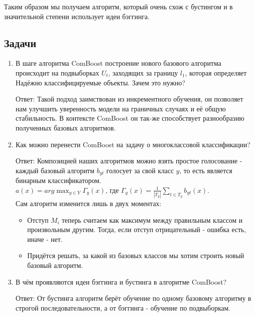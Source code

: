 Таким образом мы получаем алгоритм, который очень схож с бустингом и в значительной степени использует идеи бэггинга. \\

\subsection{Задачи}

\begin{enumerate}
    \item В шаге алгоритма ComBoost построение нового базового алгоритма происходит на подвыборках $U_t$, заходящих за границу $l_1$, которая определяет Надёжно классифицируемые объекты. Зачем это нужно?

          Ответ: Такой подход заимствован из инкрементного обучения, он позволяет нам улучшить уверенность модели на граничных случаях и её общую стабильность. В контексте ComBoost он так-же способствует разнообразию полученных базовых алгоритмов.

    \item Как можно перенести ComBoost на задачу о многоклассовой классификации?

          Ответ: Композицией наших алгоритмов можно взять простое голосование - каждый базовый алгоритм $b_{yt}$ голосует за свой класс $y$, то есть является бинарным классификатором. \\
          $a(x)=arg\max_{y\in Y}\Gamma_y(x)$, где $\Gamma_y(x) = \frac{1}{|T_y|}\sum_{t\in T_y}b_{yt}(x)$. \\
          Сам алгоритм изменится лишь в двух моментах: \\
          \begin{itemize}
              \item Отступ $M_i$ теперь считаем как максимум между правильным классом и произвольным другим. Тогда, если отступ отрицательный - ошибка есть, иначе - нет.
              \item Придётся решать, за какой из базовых классов мы хотим строить новый базовый алгоритм.
          \end{itemize}

    \item В чём проявляются идеи бэггинга и бустинга в алгоритме ComBoost?

          Ответ: От бустинга алгоритм берёт обучение по одному базовому алгоритму в строгой последовательности, а от бэггинга - обучение по подвыборкам.
\end{enumerate}


